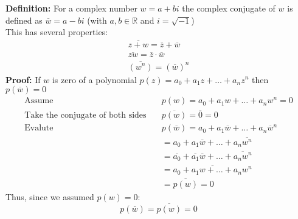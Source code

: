 \documentclass[a4paper, 8pt]{extarticle}
\begin{document}
\begin{examplebox}[Define the complex conjugate ($\overline{w}$) and prove if $w$ is a zero of a polynomial $p(z)$ = $a_0 + a_1 z + \ldots + a_n z^n$ then $\overline{w}$ is also a zero of $p(z)$ ]
	\label{sol:2021Q1b}
	\textbf{Definition:} For a complex number $w = a+bi$ the complex conjugate of $w$ is defined as $\overline{w} = a - bi$ (with $a,b \in \mathbb{R}$ and $i = \sqrt{-1}$)\\
	This has several properties:
	\begin{align*}
		\overline{z+w} = \overline{z} + \overline{w}    \\
		\overline{zw} = \overline{z} \cdot \overline{w} \\
		\overline{(w^n)} = \left(\overline{w}\right)^n
	\end{align*}
	\textbf{Proof:} If $w$ is zero of a polynomial $p(z) = a_0 + a_1 z + \ldots + a_n z^n$ then $p(\overline{w}) = 0$
	\begin{align*}
		\text{Assume} \quad                           & p(w) = a_0 + a_1 w + \ldots + a_n w^n = 0                                    \\
		\text{Take the conjugate of both sides} \quad & \overline{p(w)} = \overline{0} = 0                                           \\
		\text{Evalute} \quad                          & p(\overline{w}) = a_0 + a_1 \overline{w} + \ldots + a_n \overline{w}^n       \\
		                                              & = a_0 + a_1 \overline{w} + \ldots + a_n \overline{w^n}                       \\
		                                              & = \overline{a_0} + \overline{a_1} \overline{w} + \ldots + \overline{a_n w^n} \\
		                                              & = \overline{a_0 + a_1 w + \ldots + a_n w^n}                                  \\
		                                              & = \overline{p(w)} = 0
	\end{align*}
	Thus, since we assumed $p(w) = 0$:
	$$p(\overline{w}) = \overline{p(w)} = 0$$
\end{examplebox}
\end{document}
